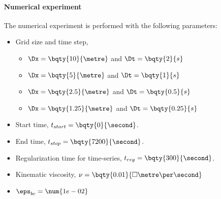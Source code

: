 \paragraph*{Numerical experiment}
The numerical experiment is performed with the following parameters:
\begin{itemize}
    \item Grid size and time step,
    \begin{itemize}
        \item $\Dx = \bqty{10}{\metre}$ and $\Dt = \bqty{2}{s}$
        \item $\Dx = \bqty{5}{\metre}$ and $\Dt = \bqty{1}{s}$
        \item $\Dx = \bqty{2.5}{\metre}$ and $\Dt = \bqty{0.5}{s}$
        \item $\Dx = \bqty{1.25}{\metre}$ and $\Dt = \bqty{0.25}{s}$
    \end{itemize}
    \item Start time, $t_{start} = \bqty{0}{\second}$.
    \item End time, $t_{stop} = \bqty{7200}{\second}$.
    \item Regularization time for time-series, $t_{reg} = \bqty{300}{\second}$.
    \item Kinematic viscosity, $\nu = \bqty{0.01}{\square\metre\per\second}$
    \item $\eps_{bc} = \num{1e-02}$
\end{itemize}
